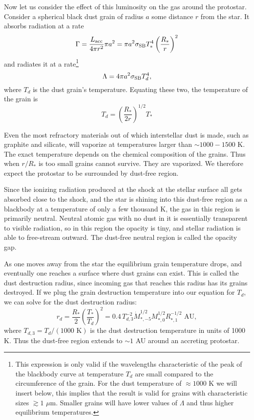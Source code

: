 Now let us consider the effect of this luminosity on the gas around the protostar. Consider a spherical black dust grain of radius $a$ some distance $r$ from the star. It absorbs radiation at a rate
\begin{equation}
\Gamma = \frac{L_{\rm acc}}{4\pi r^2} \pi a^2 = \pi a^2 \sigma_{\rm SB} T_*^4 \left(\frac{R_*}{r}\right)^2
\end{equation}
and radiates it at a rate\footnote{This expression is only valid if the wavelengths characteristic of the peak of the blackbody curve at temperature $T_d$ are small compared to the circumference of the grain. For the dust temperature of $\approx 1000$ K we will insert below, this implies that the result is valid for grains with characteristic sizes $\gtrsim 1$ $\mu$m. Smaller grains will have lower values of $\Lambda$ and thus higher equilibrium temperatures.}
\begin{equation}
\Lambda = 4\pi a^2 \sigma_{\rm SB} T_d^4,
\end{equation}
where $T_d$ is the dust grain's temperature. Equating these two, the temperature of the grain is
\begin{equation}
T_d = \left(\frac{R_*}{2r}\right)^{1/2} T_*
\end{equation}

Even the most refractory materials out of which interstellar dust is made, such as graphite and silicate, will vaporize at temperatures larger than $\sim 1000-1500$ K. The exact temperature depends on the chemical composition of the grains. Thus when $r/R_*$ is too small grains cannot survive. They are vaporized. We therefore expect the protostar to be surrounded by dust-free region.

Since the ionizing radiation produced at the shock at the stellar surface all gets absorbed close to the shock, and the star is shining into this dust-free region as a blackbody at a temperature of only a few thousand K, the gas in this region is primarily neutral. Neutral atomic gas with no dust in it is essentially transparent to visible radiation, so in this region the opacity is tiny, and stellar radiation is able to free-stream outward. The dust-free neutral region is called the opacity gap.

As one moves away from the star the equilibrium grain temperature drops, and eventually one reaches a surface where dust grains can exist. This is called the dust destruction radius, since incoming gas that reaches this radius has its grains destroyed. If we plug the grain destruction temperature into our equation for $T_d$, we can solve for the dust destruction radius:
\begin{equation}
r_d = \frac{R_*}{2} \left(\frac{T_*}{T_d}\right)^2 = 0.4 \,  T_{d,3}^{-2} \dot{M}_{*,-5}^{1/2} M_{*,0}^{1/2} R_{*,1}^{-1/2} \mbox{ AU},
\end{equation}
where $T_{d,3}=T_d/(1000\mbox{ K})$ is the dust destruction temperature in units of 1000 K. Thus the dust-free region extends to $\sim 1$ AU around an accreting protostar.

